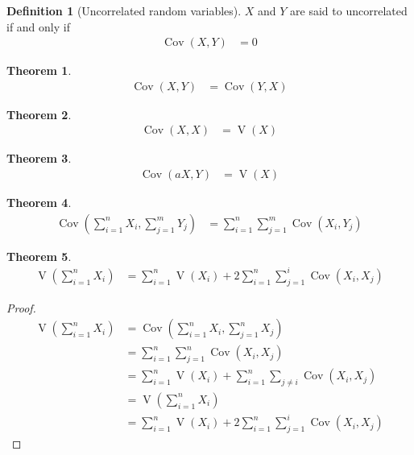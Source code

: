 \documentclass[titlepage, fleqn, a4paper, 12pt, twoside]{article}
\theoremstyle{definition}
\newtheorem{definition}{Definition}
\theoremstyle{theorem}
\newtheorem{theorem}{Theorem}
\DeclareMathOperator{\var}{\mathrm{V}}
\DeclareMathOperator{\cov}{\mathrm{Cov}}
\begin{document}
\begin{definition}[Uncorrelated random variables]
	$X$ and $Y$ are said to uncorrelated if and only if
	\begin{align*}
		\cov(X,Y) & = 0
	\end{align*}
\end{definition}

\begin{theorem}
	\begin{align*}
		\cov(X,Y) & = \cov(Y,X)
	\end{align*}
\end{theorem}

\begin{theorem}
	\begin{align*}
		\cov(X,X) & = \var(X)
	\end{align*}
\end{theorem}

\begin{theorem}
	\begin{align*}
		\cov(a X,Y) & = \var(X)
	\end{align*}
\end{theorem}

\begin{theorem}
	\begin{align*}
		\cov\left( \sum\limits_{i = 1}^{n} X_i , \sum\limits_{j = 1}^{m} Y_j \right) & = \sum\limits_{i = 1}^{n} \sum\limits_{j = 1}^{m} \cov(X_i,Y_j)
	\end{align*}
\end{theorem}

\begin{theorem}
	\begin{align*}
		\var\left( \sum\limits_{i = 1}^{n} X_i \right) & = \sum\limits_{i = 1}^{n} \var(X_i) + 2 \sum\limits_{i = 1}^{n} \sum\limits_{j = 1}^{i} \cov(X_i,X_j)
	\end{align*}
\end{theorem}

\begin{proof}
	\begin{align*}
		\var\left( \sum\limits_{i = 1}^{n} X_i \right) & = \cov(\sum\limits_{i = 1}^{n} X_i , \sum\limits_{j = 1}^{n} X_j)                                  \\
                                                               & = \sum\limits_{i = 1}^{n} \sum\limits_{j = 1}^{n} \cov\left( X_i,X_j \right)                       \\
                                                               & = \sum\limits_{i = 1}^{n} \var(X_i) + \sum\limits_{i = 1}^{n} \sum\limits_{j \neq i} \cov(X_i,X_j) \\
                                                               & = \var\left( \sum\limits_{i = 1}^{n} X_i \right)\\
							       & = \sum\limits_{i = 1}^{n} \var(X_i) + 2 \sum\limits_{i = 1}^{n} \sum\limits_{j = 1}^{i} \cov(X_i,X_j)
	\end{align*}
\end{proof}
\end{document}
